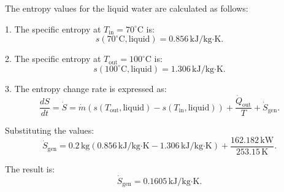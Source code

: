 The entropy values for the liquid water are calculated as follows:

1. The specific entropy at \( T_{\text{in}} = 70^\circ\text{C} \) is:  
\[
s(70^\circ\text{C}, \text{liquid}) = 0.856 \, \text{kJ}/\text{kg·K}.
\]

2. The specific entropy at \( T_{\text{out}} = 100^\circ\text{C} \) is:  
\[
s(100^\circ\text{C}, \text{liquid}) = 1.306 \, \text{kJ}/\text{kg·K}.
\]

3. The entropy change rate is expressed as:  
\[
\frac{dS}{dt} = \dot{S} = \dot{m} \left( s(T_{\text{out}}, \text{liquid}) - s(T_{\text{in}}, \text{liquid}) \right) + \frac{\dot{Q}_{\text{out}}}{T} + \dot{S}_{\text{gen}}.
\]

Substituting the values:  
\[
\dot{S}_{\text{gen}} = 0.2 \, \text{kg} \left( 0.856 \, \text{kJ}/\text{kg·K} - 1.306 \, \text{kJ}/\text{kg·K} \right) + \frac{162.182 \, \text{kW}}{253.15 \, \text{K}}.
\]

The result is:  
\[
\dot{S}_{\text{gen}} = 0.1605 \, \text{kJ}/\text{kg·K}.
\]